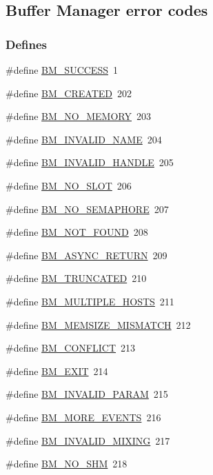 \subsection{Buffer Manager error codes}
\label{group__err22}
\subsubsection*{Defines}
\begin{DoxyCompactItemize}
\item 
\#define \hyperlink{group__err22_gadccfb762fd84f9e33940f3d1204042b0}{BM\_\-SUCCESS}~1
\item 
\#define \hyperlink{group__err22_gaf4d0ec9887b0864c100b8062d21f4c0b}{BM\_\-CREATED}~202
\item 
\#define \hyperlink{group__err22_ga5425d2a3621de60926128a3cbaa501cc}{BM\_\-NO\_\-MEMORY}~203
\item 
\#define \hyperlink{group__err22_ga3320beea9944241434c6bf98d2392414}{BM\_\-INVALID\_\-NAME}~204
\item 
\#define \hyperlink{group__err22_ga992d6577e774ebe1c50b501917c788b8}{BM\_\-INVALID\_\-HANDLE}~205
\item 
\#define \hyperlink{group__err22_ga5d9eb250e07354dc4d5de87388feff44}{BM\_\-NO\_\-SLOT}~206
\item 
\#define \hyperlink{group__err22_gaf9bc9724347f2c84c37b2725b0fa6b2c}{BM\_\-NO\_\-SEMAPHORE}~207
\item 
\#define \hyperlink{group__err22_ga3ec707ba57a9f56c19bf8d8581d8291b}{BM\_\-NOT\_\-FOUND}~208
\item 
\#define \hyperlink{group__err22_ga7fb11aaff606b1785cddd205baddbbff}{BM\_\-ASYNC\_\-RETURN}~209
\item 
\#define \hyperlink{group__err22_ga21752d578978d7ffe3cdd82e28936667}{BM\_\-TRUNCATED}~210
\item 
\#define \hyperlink{group__err22_gad1a172c4643fd4a0227f0df5bcfbd0b4}{BM\_\-MULTIPLE\_\-HOSTS}~211
\item 
\#define \hyperlink{group__err22_ga2d978469667eb3d51ea7cc48a5070a72}{BM\_\-MEMSIZE\_\-MISMATCH}~212
\item 
\#define \hyperlink{group__err22_ga0703bfd174e660aba961c696766e7066}{BM\_\-CONFLICT}~213
\item 
\#define \hyperlink{group__err22_gaa73f629c281190fdd092eed493b5245a}{BM\_\-EXIT}~214
\item 
\#define \hyperlink{group__err22_ga09095b8ac6e057d3094c99e485c1a74d}{BM\_\-INVALID\_\-PARAM}~215
\item 
\#define \hyperlink{group__err22_ga0ef7db8ae9812d639f07e3d654d76e90}{BM\_\-MORE\_\-EVENTS}~216
\item 
\#define \hyperlink{group__err22_ga57d1cf336a7a69397d8a6b1d2d40bf27}{BM\_\-INVALID\_\-MIXING}~217
\item 
\#define \hyperlink{group__err22_gaf32276ec7c00c33b4c45bd0b382b8ffb}{BM\_\-NO\_\-SHM}~218
\end{DoxyCompactItemize}



